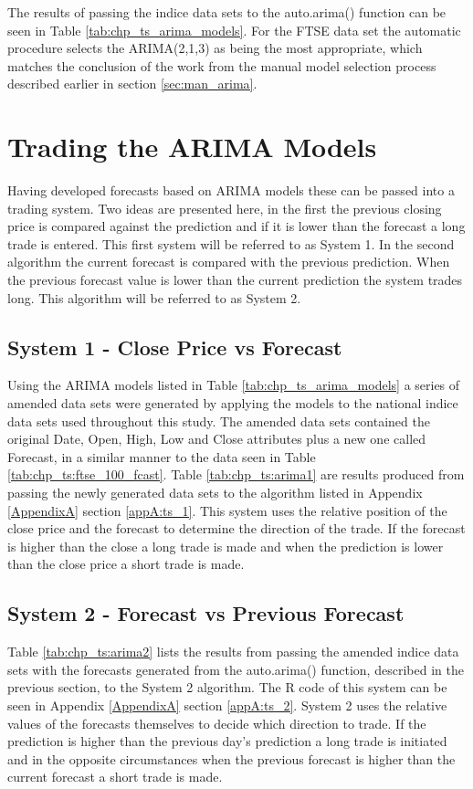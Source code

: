 The results of passing the indice data sets to the auto.arima() function can be seen in Table \ref{tab:chp_ts_arima_models}. For the FTSE data set the automatic procedure selects the ARIMA(2,1,3) as being the most appropriate, which matches the conclusion of the work from the manual model selection process described earlier in section \ref{sec:man_arima}.



\section{Trading the ARIMA Models}
\label{sec:traing:arima:models}
Having developed forecasts based on ARIMA models these can be passed into a trading system. Two ideas are presented here, in the first the previous closing price is compared against the prediction and if it is lower than the forecast a long trade is entered. This first system will be referred to as System 1. In the second algorithm the current forecast is compared with the previous prediction. When the previous forecast value is lower than the current prediction the system trades long. This algorithm will be referred to as System 2.

\subsection{System 1 - Close Price vs Forecast}
Using the ARIMA models listed in Table \ref{tab:chp_ts_arima_models} a series of amended data sets were generated by applying the models to the national indice data sets used throughout this study. The amended data sets contained the original Date, Open, High, Low and Close attributes plus a new one called Forecast, in a similar manner to the data seen in Table  \ref{tab:chp_ts:ftse_100_fcast}. Table \ref{tab:chp_ts:arima1} are results produced from passing the newly generated data sets to the algorithm listed in Appendix \ref{AppendixA} section \ref{appA:ts_1}. This system uses the relative position of the close price and the forecast to determine the direction of the trade. If the forecast is higher than the close a long trade is made and when the prediction is lower than the close price a short trade is made.



\subsection{System 2 - Forecast vs Previous Forecast}
Table \ref{tab:chp_ts:arima2} lists the results from passing the amended indice data sets with the forecasts generated from the auto.arima() function, described in the previous section, to the System 2 algorithm. The R code of this system can be seen in  Appendix \ref{AppendixA} section \ref{appA:ts_2}. System 2 uses the relative values of the forecasts themselves to decide which direction to trade. If the prediction is higher than the previous day's prediction a long trade is initiated and in the opposite circumstances when the previous forecast is higher than the current forecast a short trade is made.

